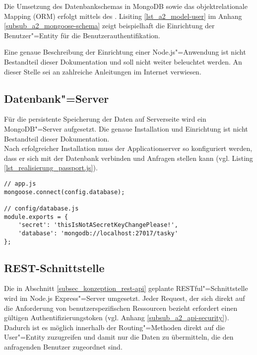 Die Umsetzung des Datenbankschemas in MongoDB sowie das objektrelationale Mapping (ORM) erfolgt mittels des  . Lisiting \ref{lst_a2_model-user} im Anhang \ref{subsub_a2_mongoose-schema} zeigt beispielhaft die Einrichtung der Benutzer"=Entity für die Benutzerauthentifikation. 

Eine genaue Beschreibung der Einrichtung einer Node.js"=Anwendung ist nicht Bestandteil dieser Dokumentation und soll nicht weiter beleuchtet werden. An dieser Stelle sei an zahlreiche Anleitungen im Internet verwiesen.

\subsection{Datenbank"=Server}
\label{subsec_implementierung_datenbank}

Für die persistente Speicherung der Daten auf Serverseite wird ein MongoDB"=Server aufgesetzt. Die genaue Installation und Einrichtung ist nicht Bestandteil dieser Dokumentation. \\
Nach erfolgreicher Installation muss der Applicationserver so konfiguriert werden, dass er sich mit der Datenbank verbinden und Anfragen stellen kann (vgl. Listing \ref{lst_realisierung_passport.js}).

\begin{lstlisting}[caption={Verbindung zur Datenbank konfigurieren},label={lst_realisierung_passport.js}, frame=single]
// app.js 
mongoose.connect(config.database);

// config/database.js
module.exports = {
    'secret': 'thisIsNotASecretKeyChangePlease!',
    'database': 'mongodb://localhost:27017/tasky'
};
\end{lstlisting}


\subsection{REST-Schnittstelle}

Die in Abschnitt \ref{subsec_konzeption_rest-api} geplante RESTful"=Schnittstelle wird im Node.js Express"=Server umgesetzt. Jeder Request, der sich direkt auf die Anforderung von benutzerspezifischen Ressourcen bezieht erfordert einen gültigen Authentifizierungstoken (vgl. Anhang \ref{subsub_a2_api-security}). Dadurch ist es möglich innerhalb der Routing"=Methoden direkt auf die User"=Entity zuzugreifen und damit nur die Daten zu übermitteln, die den anfragenden Benutzer zugeordnet sind.

